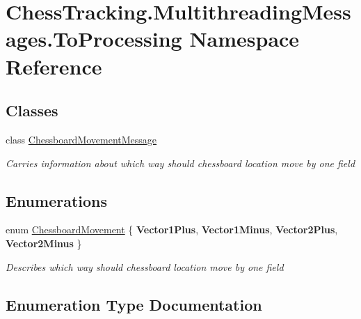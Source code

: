 \hypertarget{namespace_chess_tracking_1_1_multithreading_messages_1_1_to_processing}{}\section{Chess\+Tracking.\+Multithreading\+Messages.\+To\+Processing Namespace Reference}
\label{namespace_chess_tracking_1_1_multithreading_messages_1_1_to_processing}
\subsection*{Classes}
\begin{DoxyCompactItemize}
\item 
class \mbox{\hyperlink{class_chess_tracking_1_1_multithreading_messages_1_1_to_processing_1_1_chessboard_movement_message}{Chessboard\+Movement\+Message}}
\begin{DoxyCompactList}\small\item\em Carries information about which way should chessboard location move by one field \end{DoxyCompactList}\end{DoxyCompactItemize}
\subsection*{Enumerations}
\begin{DoxyCompactItemize}
\item 
enum \mbox{\hyperlink{namespace_chess_tracking_1_1_multithreading_messages_1_1_to_processing_af48751428f7a12d314dbbac688726bac}{Chessboard\+Movement}} \{ {\bfseries Vector1\+Plus}, 
{\bfseries Vector1\+Minus}, 
{\bfseries Vector2\+Plus}, 
{\bfseries Vector2\+Minus}
 \}
\begin{DoxyCompactList}\small\item\em Describes which way should chessboard location move by one field \end{DoxyCompactList}\end{DoxyCompactItemize}


\subsection{Enumeration Type Documentation}
\mbox{\label{namespace_chess_tracking_1_1_multithreading_messages_1_1_to_processing_af48751428f7a12d314dbbac688726bac}} 
